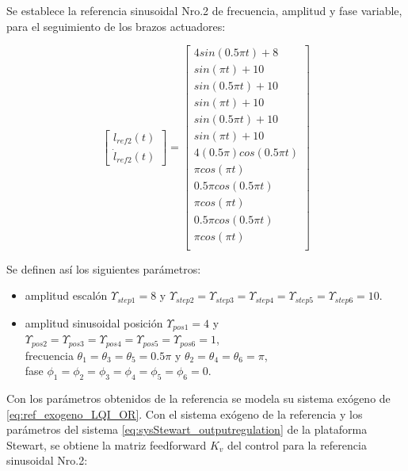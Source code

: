 Se establece la referencia sinusoidal Nro.2 de frecuencia, amplitud y fase variable, para el seguimiento de los brazos actuadores:

\begin{equation}
    \begin{bmatrix}
        l_{ref2}(t) \\ \dot{l}_{ref2}(t)
    \end{bmatrix} = \begin{bmatrix}
        4 sin(0.5\pi t ) + 8\\
        sin(\pi t ) + 10\\
        sin(0.5\pi t ) + 10\\
        sin(\pi t ) + 10\\
        sin(0.5\pi t ) + 10\\
        sin(\pi t ) + 10\\
        4(0.5\pi) cos(0.5\pi t )\\
        \pi cos(\pi t )\\
        0.5\pi cos(0.5\pi t )\\
        \pi cos(\pi t )\\
        0.5\pi cos(0.5\pi t )\\
        \pi cos(\pi t )\\
    \end{bmatrix}
\end{equation}

Se definen así los siguientes parámetros:
\begin{itemize}
    \item amplitud escalón $\Upsilon_{step1}=8$ y $\Upsilon_{step2}=\Upsilon_{step3}=\Upsilon_{step4}=\Upsilon_{step5}=\Upsilon_{step6}=10$.
    \item amplitud sinusoidal posición $\Upsilon_{pos1}=4$ y $\Upsilon_{pos2}=\Upsilon_{pos3}=\Upsilon_{pos4}=\Upsilon_{pos5}=\Upsilon_{pos6}=1$, \\
    frecuencia $\theta_1=\theta_3=\theta_5=0.5\pi$ y $\theta_2=\theta_4=\theta_6=\pi$, \\
    fase $\phi_1=\phi_2=\phi_3=\phi_4=\phi_5=\phi_6=0$.
\end{itemize}

Con los parámetros obtenidos de la referencia se modela su sistema exógeno de \ref{eq:ref_exogeno_LQI_OR}. Con el sistema exógeno de la referencia y los parámetros del sistema \ref{eq:sysStewart_outputregulation} de la plataforma Stewart, se obtiene la matriz feedforward $K_v$ del control para la referencia sinusoidal Nro.2:

